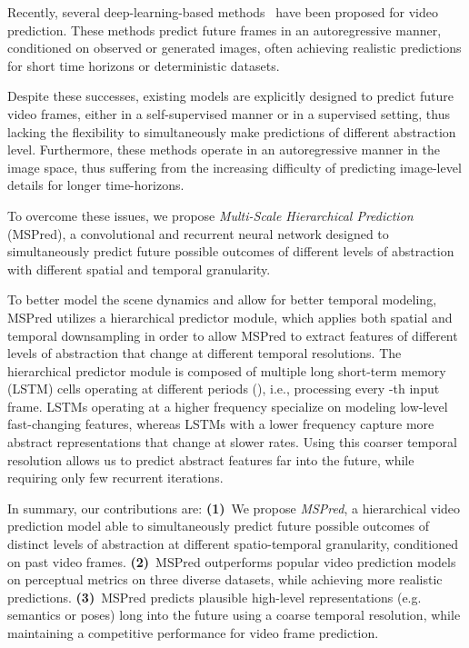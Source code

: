 \documentclass{bmvc2k}
\begin{document}
Recently, several deep-learning-based methods~\cite{Denton_StochasticVideoGenerationWithALearnedPrior_2018, Saxena_ClockworkVariationalAutoencoders_2021, Villegas_HighFidelityVideoPrediction_2019, Castrejon_ImprovedVRNNsForVideoPrediction_2019, Oprea_VideoPredictionReview_2020} have been proposed for video prediction.
These methods predict future frames in an autoregressive manner, conditioned on observed or generated images, often achieving realistic predictions for short time horizons or deterministic datasets.

Despite these successes, existing models are explicitly designed to predict future video frames, either in a self-supervised manner or in a supervised setting, thus lacking the flexibility to simultaneously make predictions of different abstraction level.
Furthermore, these methods operate in an autoregressive manner in the image space, thus suffering from the increasing difficulty of predicting image-level details for longer time-horizons.


To overcome these issues, we propose \emph{Multi-Scale Hierarchical Prediction} (MSPred), a convolutional and recurrent neural network designed to simultaneously predict future possible outcomes of different levels of abstraction with different spatial and temporal granularity.

To better model the scene dynamics and allow for better temporal modeling, MSPred utilizes a hierarchical predictor module, which applies both spatial and temporal downsampling in order to allow MSPred to extract features of different levels of abstraction that change at different temporal resolutions.
The hierarchical predictor module is composed of multiple long short-term memory~\cite{Hochreiter_LongShortTermMemory_1997} (LSTM) cells operating at different periods (), i.e., processing every -th input frame. LSTMs operating at a higher frequency specialize on modeling low-level fast-changing features, whereas LSTMs with a lower frequency capture more abstract representations that change at slower rates. Using this coarser temporal resolution allows us to predict abstract features far into the future, while requiring only few recurrent iterations.

In summary, our contributions are:
\textbf{(1)}~We propose \emph{MSPred}, a hierarchical video prediction model able to simultaneously predict future possible outcomes of distinct levels of abstraction at different spatio-temporal granularity, conditioned on past video frames.
\textbf{(2)}~MSPred outperforms popular video prediction models on perceptual metrics on three diverse datasets, while achieving more realistic predictions.
\textbf{(3)}~MSPred predicts plausible high-level representations (e.g. semantics or poses) long into the future using a coarse temporal resolution, while maintaining a competitive performance for video frame prediction.
\end{document}
